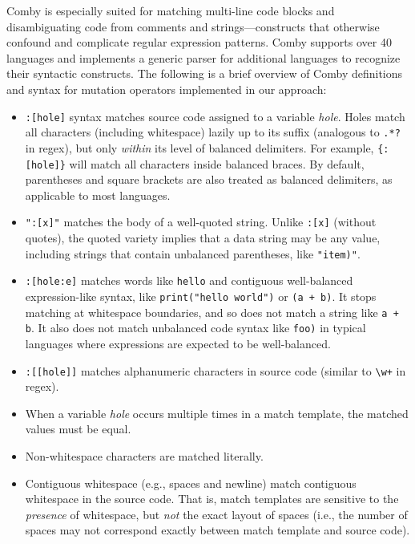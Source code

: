 \documentclass[sigconf,review, anonymous]{acmart}
\begin{document}
{Comby is especially suited for matching multi-line code blocks and
disambiguating code from comments and strings---constructs that otherwise
confound and complicate regular expression patterns. Comby supports over 40
languages and implements a generic parser for additional languages to recognize
their syntactic constructs. The following is a brief overview of Comby
definitions and syntax for mutation operators implemented in our approach:

\begin{itemize}

\item \texttt{\small:[hole]} syntax matches source code assigned to a variable \emph{hole}. Holes match all characters (including whitespace) lazily up to its suffix (analogous to \texttt{\small.*?} in regex), but only \emph{within} its level of balanced delimiters. For example, \texttt{\small\{:[hole]\}} will match all characters inside balanced braces. By default, parentheses and square brackets are also treated as balanced delimiters, as applicable to most languages. 

\item \texttt{\small ":[x]"} matches the body of a well-quoted string. Unlike \texttt{\small :[x]} (without quotes), the quoted variety implies that a data string may be any value, including strings that contain unbalanced parentheses, like \texttt{\small "item)"}.

\item \texttt{\small:[hole:e]} matches words like \texttt{\small hello} and contiguous well-balanced expression-like syntax, like \texttt{\small print("hello world")} or \texttt{\small (a + b)}. It stops matching at whitespace boundaries, and so does not match a string like \texttt{\small a + b}. It also does not match unbalanced code syntax like \texttt{\small foo)} in typical languages where expressions are expected to be well-balanced.

\item \texttt{\small :[[hole]]} matches alphanumeric characters in source code (similar to \texttt{\small\textbackslash w+} in regex).

\item When a variable \emph{hole} occurs multiple times in a match
  template, the matched values must be equal.

\item Non-whitespace characters are matched literally.

\item Contiguous whitespace (e.g., spaces and newline) match contiguous whitespace in the source code. That is, match templates are sensitive to the \emph{presence} of whitespace, but \emph{not} the exact layout of spaces (i.e., the number of spaces may not correspond exactly between match template and source code).


\end{itemize}}
\end{document}
